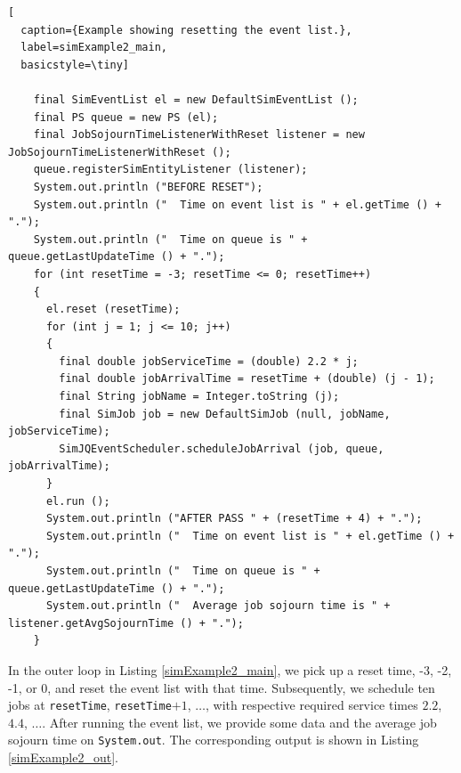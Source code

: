 \documentclass[12pt]{book}
\begin{document}
\begin{lstlisting}[
  caption={Example showing resetting the event list.},
  label=simExample2_main,
  basicstyle=\tiny]

    final SimEventList el = new DefaultSimEventList ();
    final PS queue = new PS (el);
    final JobSojournTimeListenerWithReset listener = new JobSojournTimeListenerWithReset ();
    queue.registerSimEntityListener (listener);
    System.out.println ("BEFORE RESET");
    System.out.println ("  Time on event list is " + el.getTime () + ".");
    System.out.println ("  Time on queue is " + queue.getLastUpdateTime () + ".");
    for (int resetTime = -3; resetTime <= 0; resetTime++)
    {
      el.reset (resetTime);
      for (int j = 1; j <= 10; j++)
      {
        final double jobServiceTime = (double) 2.2 * j;
        final double jobArrivalTime = resetTime + (double) (j - 1);
        final String jobName = Integer.toString (j);
        final SimJob job = new DefaultSimJob (null, jobName, jobServiceTime);
        SimJQEventScheduler.scheduleJobArrival (job, queue, jobArrivalTime);
      }
      el.run ();
      System.out.println ("AFTER PASS " + (resetTime + 4) + ".");
      System.out.println ("  Time on event list is " + el.getTime () + ".");
      System.out.println ("  Time on queue is " + queue.getLastUpdateTime () + ".");
      System.out.println ("  Average job sojourn time is " + listener.getAvgSojournTime () + ".");
    }

\end{lstlisting}

In the outer loop in Listing \ref{simExample2_main},
  we pick up a reset time,
  -3, -2, -1, or 0,
  and reset the event list with that time.
Subsequently, we schedule ten jobs
  at \lstinline|resetTime|, \lstinline|resetTime|$+1$, $\ldots$,
  with respective required service times
  $2.2$, $4.4$, $\ldots$.
After running the event list,
  we provide some data and the average job sojourn time on \lstinline|System.out|.
The corresponding output is shown in Listing \ref{simExample2_out}.
\end{document}
